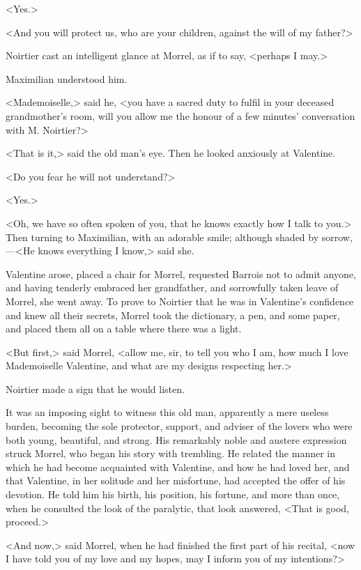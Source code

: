  <Yes.> 

 <And you will protect us, who are your children, against the will of my father?> 

 Noirtier cast an intelligent glance at Morrel, as if to say, <perhaps I may.> 

 Maximilian understood him. 

 <Mademoiselle,> said he, <you have a sacred duty to fulfil in your deceased grandmother's room, will you allow me the honour of a few minutes' conversation with M. Noirtier?> 

 <That is it,> said the old man's eye. Then he looked anxiously at Valentine. 

 <Do you fear he will not understand?> 

 <Yes.> 

 <Oh, we have so often spoken of you, that he knows exactly how I talk to you.> Then turning to Maximilian, with an adorable smile; although shaded by sorrow,—<He knows everything I know,> said she. 

 Valentine arose, placed a chair for Morrel, requested Barrois not to admit anyone, and having tenderly embraced her grandfather, and sorrowfully taken leave of Morrel, she went away. To prove to Noirtier that he was in Valentine's confidence and knew all their secrets, Morrel took the dictionary, a pen, and some paper, and placed them all on a table where there was a light. 

 <But first,> said Morrel, <allow me, sir, to tell you who I am, how much I love Mademoiselle Valentine, and what are my designs respecting her.> 

 Noirtier made a sign that he would listen. 

 It was an imposing sight to witness this old man, apparently a mere useless burden, becoming the sole protector, support, and adviser of the lovers who were both young, beautiful, and strong. His remarkably noble and austere expression struck Morrel, who began his story with trembling. He related the manner in which he had become acquainted with Valentine, and how he had loved her, and that Valentine, in her solitude and her misfortune, had accepted the offer of his devotion. He told him his birth, his position, his fortune, and more than once, when he consulted the look of the paralytic, that look answered, <That is good, proceed.> 

 <And now,> said Morrel, when he had finished the first part of his recital, <now I have told you of my love and my hopes, may I inform you of my intentions?> 

